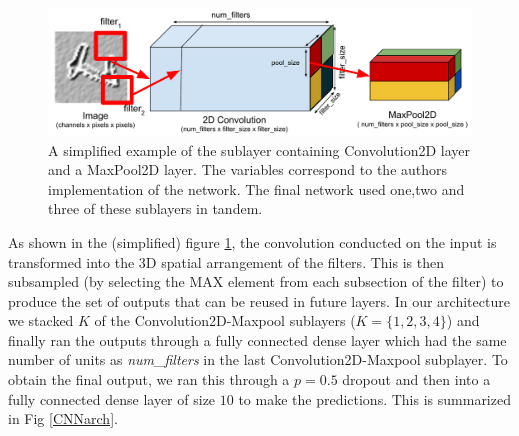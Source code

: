 \documentclass[conference]{IEEEtran}
\begin{document}
\begin{figure}[h]

	\includegraphics[scale=0.40]{convnet_example.pdf}
	\caption{A simplified example of the sublayer containing Convolution2D layer and a MaxPool2D layer. The variables correspond to the authors implementation of the network. The final network used one,two and three of these sublayers in tandem.}
	\label{convmaxlayer}
\end{figure}

As shown in the (simplified) figure \ref{convmaxlayer}, the convolution conducted on the input is transformed into the 3D spatial arrangement of the filters. This is then subsampled (by selecting the MAX element from each subsection of the filter) to produce the set of outputs that can be reused in future layers. In our architecture we stacked $K$ of the Convolution2D-Maxpool sublayers ($K=\{1,2,3,4\}$) and finally ran the outputs through a fully connected dense layer which had the same number of units as \emph{num\_filters} in the last Convolution2D-Maxpool subplayer. To obtain the final output, we ran this through a $p=0.5$ dropout and then into a fully connected dense layer of size $10$ to make the predictions. This is summarized in Fig \ref{CNNarch}. 
\end{document}
